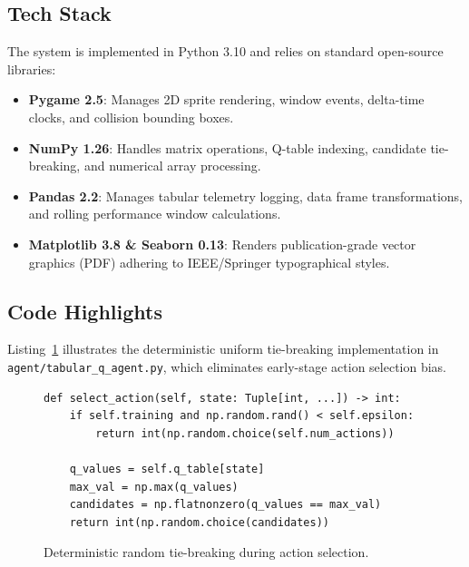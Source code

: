 \subsection{Tech Stack}
The system is implemented in Python 3.10 and relies on standard open-source libraries:
\begin{itemize}
    \item \textbf{Pygame 2.5}: Manages 2D sprite rendering, window events, delta-time clocks, and collision bounding boxes.
    \item \textbf{NumPy 1.26}: Handles matrix operations, Q-table indexing, candidate tie-breaking, and numerical array processing.
    \item \textbf{Pandas 2.2}: Manages tabular telemetry logging, data frame transformations, and rolling performance window calculations.
    \item \textbf{Matplotlib 3.8 \& Seaborn 0.13}: Renders publication-grade vector graphics (PDF) adhering to IEEE/Springer typographical styles.
\end{itemize}

\subsection{Code Highlights}
Listing~\ref{lst:tie_break} illustrates the deterministic uniform tie-breaking implementation in \texttt{agent/tabular\_q\_agent.py}, which eliminates early-stage action selection bias.

\begin{figure}[h]
\begin{center}
\begin{minipage}{0.9\textwidth}
\begin{verbatim}
def select_action(self, state: Tuple[int, ...]) -> int:
    if self.training and np.random.rand() < self.epsilon:
        return int(np.random.choice(self.num_actions))
    
    q_values = self.q_table[state]
    max_val = np.max(q_values)
    candidates = np.flatnonzero(q_values == max_val)
    return int(np.random.choice(candidates))
\end{verbatim}
\end{minipage}
\end{center}
\caption{Deterministic random tie-breaking during action selection.}
\label{lst:tie_break}
\end{figure}
